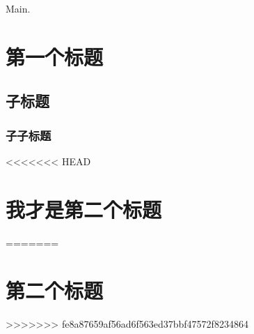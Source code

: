\documentclass{article}
\begin{document}
Main.

\section{第一个标题}

\subsection{子标题}

\subsubsection{子子标题}

<<<<<<< HEAD
\section{我才是第二个标题}
=======
\section{第二个标题}
>>>>>>> fe8a87659af56ad6f563ed37bbf47572f8234864
\end{document}
